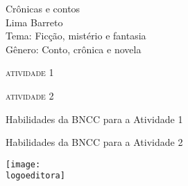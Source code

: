\documentclass[smaller,professionalfonts,15pt]{beamer}
\begin{document}
										\begin{frame}\begin{raggedleft}
										\Huge 
Crônicas e contos						\\
										\huge 
Lima Barreto							\\
										\bigskip
										\normalsize
Tema: Ficção, mistério e fantasia		\\	
Gênero: Conto, crônica e novela			\\\vfill\hfill
\publishername
										\end{raggedleft}

\end{frame}


\begin{frame}
\begin{figure}
\hfill{}
\end{figure}
\end{frame}


\begin{frame}
\hfill\Huge
\textsc{atividade 1}
\end{frame}


\begin{frame}
\hfill\Huge
\textsc{atividade 2}
\end{frame}

\begin{frame}[plain]{Habilidades da BNCC para a Atividade 1}
\vspace{-2cm}

\end{frame}

\begin{frame}[plain]{Habilidades da BNCC para a Atividade 2}
\vspace{-2cm}

\end{frame}


\begin{frame}
\centering\hfill\texttt{[image: \\logoeditora]}
\end{frame}
\end{document}
